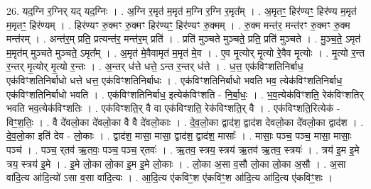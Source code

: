 \documentclass[17pt]{extarticle}
\begin{document}
26. यद॒ग्नि र॒ग्निर् यद् यद॒ग्निः । . अ॒ग्नि र॒मृत॑ म॒मृत॑ म॒ग्नि र॒ग्नि र॒मृत᳚म् । . अ॒मृतꣳ॒॒ हिर॑ण्यꣳ॒॒ हिर॑ण्य म॒मृत॑ म॒मृतꣳ॒॒ हिर॑ण्यम् । . हिर॑ण्यꣳ रु॒क्मꣳ रु॒क्मꣳ हिर॑ण्यꣳ॒॒ हिर॑ण्यꣳ रु॒क्मम् । . रु॒क्म मन्त॑र॒ मन्त॑रꣳ रु॒क्मꣳ रु॒क्म मन्त॑रम् । . अन्त॑र॒म् प्रति॒ प्रत्यन्त॑र॒ मन्त॑र॒म् प्रति॑ । . प्रति॑ मुञ्चते मुञ्चते॒ प्रति॒ प्रति॑ मुञ्चते । . मु॒ञ्च॒ते॒ ऽमृत॑ म॒मृत॑म् मुञ्चते मुञ्चते॒ ऽमृत᳚म् । . अ॒मृत॑ मे॒वैवामृत॑ म॒मृत॑ मे॒व । . ए॒व मृ॒त्योर् मृ॒त्यो रे॒वैव मृ॒त्योः । . मृ॒त्यो र॒न्त र॒न्तर् मृ॒त्योर् मृ॒त्यो र॒न्तः । . अ॒न्तर् ध॑त्ते धत्ते॒ ऽन्त र॒न्तर् ध॑त्ते । . ध॒त्त॒ एक॑विꣳशतिनिर्बाध॒ एक॑विꣳशतिनिर्बाधो धत्ते धत्त॒ एक॑विꣳशतिनिर्बाधः । . एक॑विꣳशतिनिर्बाधो भवति भव॒ त्येक॑विꣳशतिनिर्बाध॒ एक॑विꣳशतिनिर्बाधो भवति । . एक॑विꣳशतिनिर्बाध॒ इत्येक॑विꣳशति - नि॒र्बा॒धः॒ । . भ॒व॒त्येक॑विꣳशति॒ रेक॑विꣳशतिर् भवति भव॒त्येक॑विꣳशतिः । . एक॑विꣳशति॒र् वै वा एक॑विꣳशति॒ रेक॑विꣳशति॒र् वै । . एक॑विꣳशति॒रित्येक॑ - विꣳ॒॒श॒तिः॒ । . वै दे॑वलो॒का दे॑वलो॒का वै वै दे॑वलो॒काः । . दे॒व॒लो॒का द्वाद॑श॒ द्वाद॑श देवलो॒का दे॑वलो॒का द्वाद॑श । . दे॒व॒लो॒का इति॑ देव - लो॒काः । . द्वाद॑श॒ मासा॒ मासा॒ द्वाद॑श॒ द्वाद॑श॒ मासाः᳚ । . मासाः॒ पञ्च॒ पञ्च॒ मासा॒ मासाः॒ पञ्च॑ । . पञ्च॒ र्‌तव॑ ऋ॒तवः॒ पञ्च॒ पञ्च॒ र्‌तवः॑ । . ऋ॒तव॒ स्त्रय॒ स्त्रय॑ ऋ॒तव॑ ऋ॒तव॒ स्त्रयः॑ । . त्रय॑ इ॒म इ॒मे त्रय॒ स्त्रय॑ इ॒मे । . इ॒मे लो॒का लो॒का इ॒म इ॒मे लो॒काः । . लो॒का अ॒सा व॒सौ लो॒का लो॒का अ॒सौ । . अ॒सा वा॑दि॒त्य आ॑दि॒त्यो॑ ऽसा व॒सा वा॑दि॒त्यः । . आ॒दि॒त्य ए॑कविꣳ॒॒श ए॑कविꣳ॒॒श आ॑दि॒त्य आ॑दि॒त्य ए॑कविꣳ॒॒शः । \newline
\end{document}
